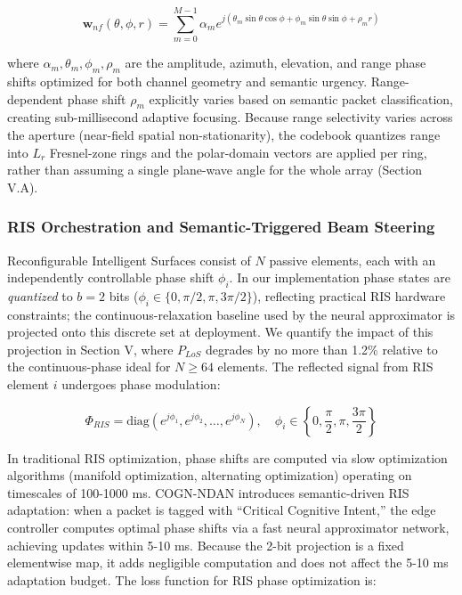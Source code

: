\documentclass[journal]{IEEEtran}
\newcommand{\COGN}{COGN-NDAN}
\begin{document}
\begin{equation}
    \mathbf{w}_{nf}(\theta, \phi, r) = \sum_{m=0}^{M-1} \alpha_m e^{j(\theta_m \sin\theta \cos\phi + \phi_m \sin\theta \sin\phi + \rho_m r)}
\end{equation}

where $\alpha_m, \theta_m, \phi_m, \rho_m$ are the amplitude, azimuth, elevation, and range phase shifts optimized for both channel geometry and semantic urgency. Range-dependent phase shift $\rho_m$ explicitly varies based on semantic packet classification, creating sub-millisecond adaptive focusing. Because range selectivity varies across the aperture (near-field spatial non-stationarity), the codebook quantizes range into $L_r$ Fresnel-zone rings and the polar-domain vectors are applied per ring, rather than assuming a single plane-wave angle for the whole array (Section V.A).

\subsubsection{RIS Orchestration and Semantic-Triggered Beam Steering}
Reconfigurable Intelligent Surfaces consist of $N$ passive elements, each with an independently controllable phase shift $\phi_i$. In our implementation phase states are \emph{quantized} to $b = 2$ bits ($\phi_i \in \{0, \pi/2, \pi, 3\pi/2\}$), reflecting practical RIS hardware constraints; the continuous-relaxation baseline used by the neural approximator is projected onto this discrete set at deployment. We quantify the impact of this projection in Section V, where $P_{LoS}$ degrades by no more than 1.2\% relative to the continuous-phase ideal for $N \ge 64$ elements. The reflected signal from RIS element $i$ undergoes phase modulation:

\begin{equation}
    \Phi_{RIS} = \text{diag}(e^{j\phi_1}, e^{j\phi_2}, \ldots, e^{j\phi_N}), \quad \phi_i \in \left\{0, \frac{\pi}{2}, \pi, \frac{3\pi}{2}\right\}
\end{equation}

In traditional RIS optimization, phase shifts are computed via slow optimization algorithms (manifold optimization, alternating optimization) operating on timescales of 100-1000 ms. \COGN{} introduces semantic-driven RIS adaptation: when a packet is tagged with ``Critical Cognitive Intent,'' the edge controller computes optimal phase shifts via a fast neural approximator network, achieving updates within 5-10 ms. Because the 2-bit projection is a fixed elementwise map, it adds negligible computation and does not affect the 5-10 ms adaptation budget. The loss function for RIS phase optimization is:
\end{document}
